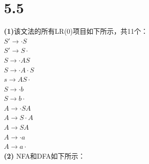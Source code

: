 \documentclass{article}
\begin{document}
\section*{5.5}
\noindent 
\textbf{(1)}该文法的所有LR(0)项目如下所示，共11个：\\
$S'\rightarrow\cdot S$\\
$S'\rightarrow S\cdot$\\
$S\rightarrow \cdot AS$\\
$S\rightarrow\cdot A\cdot S$\\
$s\rightarrow AS\cdot $\\
$S\rightarrow\cdot b$\\
$S\rightarrow b\cdot$\\
$A\rightarrow\cdot SA$\\
$A\rightarrow S\cdot A$\\
$A\rightarrow SA$\\
$A\rightarrow\cdot a$\\
$A\rightarrow a\cdot $\\
\textbf{(2)}
NFA和DFA如下所示：\\
\end{document}

